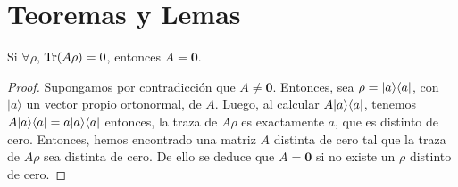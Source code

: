\section{Teoremas y Lemas}
\begin{lemma}\label{lemma_traza_cero} Si $\forall\rho$, ${\rm Tr}(A\rho)=0$, entonces $A=\mathbf{0}$.\end{lemma}\begin{proof} Supongamos por contradicción que $A\ne \mathbf{0}$. Entonces, sea $\rho=|a\rangle \langle a|$, con $|a\rangle$ un vector propio ortonormal, de $A$. Luego, al calcular $A|a\rangle \langle a|$, tenemos $A|a\rangle \langle a|=a|a\rangle \langle a|$ entonces, la traza  de $A\rho$ es exactamente $a$, que es distinto de cero.
Entonces, hemos encontrado una matriz $A$ distinta de cero tal que la traza de $A\rho$ sea distinta de cero. De ello se deduce que $A = \mathbf{0}$ si no existe un $\rho$ distinto de cero.\end{proof}
